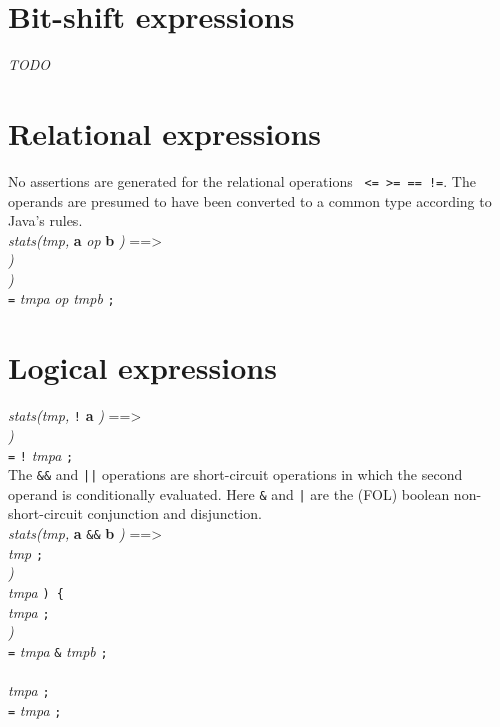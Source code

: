 \documentclass{report}%
\newcommand{\ind}{\hspace*{2em}}
\begin{document}
\section{Bit-shift expressions}

{\em TODO}

\section{Relational expressions}

\noindent
No assertions are generated for the relational operations {\tt < > <= >= == !=}. The operands are presumed to have been converted to a common type according to Java's rules.\\

\noindent
{\em stats(tmp, }{\bf a} {\em op} {\bf b} {\em )} ==> \\
\ind {\em stats(tmpa, }{\bf a} {\em )} \\
\ind {\em stats(tmpb, }{\bf b} {\em )} \\
\ind {\em T tmp} {\tt =} {\em tmpa} {\em op} {\em tmpb} {\tt ;}\\

\section{Logical expressions}

\noindent
{\em stats(tmp,} {\tt !} {\bf a} {\em )} ==> \\
\ind {\em stats(tmpa, }{\bf a} {\em )} \\
\ind {\em T tmp} {\tt =} {\tt !} {\em tmpa} {\tt ;}\\

\noindent
The {\tt \&\&} and {\tt ||} operations are short-circuit operations in which the second operand is conditionally evaluated.
Here {\tt \&} and {\tt |} are the (FOL) boolean non-short-circuit conjunction and disjunction.\\

\noindent
{\em stats(tmp, }{\bf a} {\tt \&\&} {\bf b} {\em )} ==> \\
\ind {\tt boolean } {\em tmp} {\tt ;} \\
\ind {\em stats(tmpa, }{\bf a} {\em )} \\
\ind {\tt if (} {\em tmpa} {\tt ) \{} \\
\ind\ind {\tt //@ assume} {\em tmpa} {\tt ;} \\
\ind\ind {\em stats(tmpb, }{\bf b} {\em )} \\
\ind\ind {\em tmp} {\tt =} {\em tmpa} {\tt \&} {\em tmpb} {\tt ;}\\
\ind {\tt \} else \{}\\
\ind\ind {\tt //@ assume !} {\em tmpa} {\tt ;} \\
\ind\ind {\em tmp} {\tt =} {\em tmpa} {\tt ;}\\
\ind {\tt \}}\\
\end{document}
